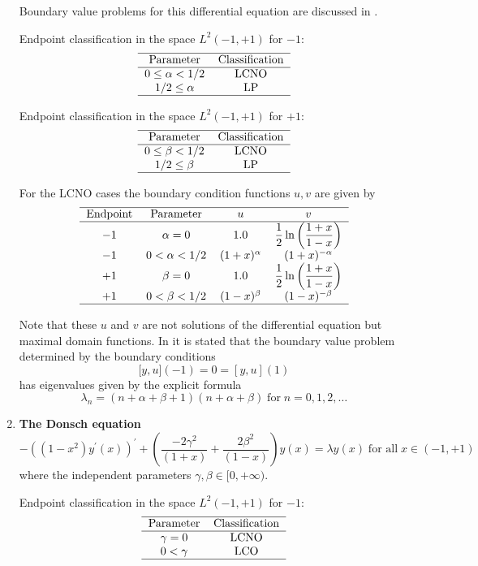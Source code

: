 \documentclass[12pt]{amsart}%
\theoremstyle{plain}
\numberwithin{equation}{section}
\begin{document}
\begin{enumerate}
Boundary value problems for this differential equation are discussed in
\cite[Chapter VIII, Pages 1515-20]{DS}.

Endpoint classification in the space $L^{2}(-1,+1)$ for $-1$:%
\[%
\begin{tabular}
[c]{cc}\hline
Parameter & Classification\\\hline
$0\leq\alpha<1/2$ & LCNO\\
$1/2\leq\alpha$ & LP\\\hline
\end{tabular}
\]

Endpoint classification in the space $L^{2}(-1,+1)$ for $+1$:%
\[%
\begin{tabular}
[c]{cc}\hline
Parameter & Classification\\\hline
$0\leq\beta<1/2$ & LCNO\\
$1/2\leq\beta$ & LP\\\hline
\end{tabular}
\]

For the LCNO cases the boundary condition functions $u,v$ are given by%
\[%
\begin{tabular}
[c]{cccc}\hline
Endpoint & Parameter & $u$ & $v$\\\hline
$-1$ & $\alpha=0$ & $1.0$ & $\dfrac{1}{2}\ln\left(  \dfrac{1+x}{1-x}\right)
$\\
$-1$ & $0<\alpha<1/2$ & $(1+x)^{\alpha}$ & $(1+x)^{-\alpha}$\\
$+1$ & $\beta=0$ & $1.0$ & $\dfrac{1}{2}\ln\left(  \dfrac{1+x}{1-x}\right)
$\\
$+1$ & $0<\beta<1/2$ & $(1-x)^{\beta}$ & $(1-x)^{-\beta}$\\\hline
\end{tabular}
\]

Note that these $u$ and $v$ are not solutions of the differential equation but
maximal domain functions. In \cite[Page 1519]{DS} it is stated that the
boundary value problem determined by the boundary conditions
\[
\lbrack y,u](-1)=0=[y,u](1)
\]
has eigenvalues given by the explicit formula
\[
\lambda_{n}=(n+\alpha+\beta+1)(n+\alpha+\beta)\;\text{for}\;n=0,1,2,\ldots
\]

\item \textbf{The Donsch equation}%
\[
-\left(  (1-x^{2})y^{\prime}(x)\right)  ^{\prime}+\left(  \frac{-2\gamma^{2}%
}{(1+x)}+\frac{2\beta^{2}}{(1-x)}\right)  y(x)=\lambda y(x)\;\text{for
all}\;x\in(-1,+1)
\]
where the independent parameters $\gamma,\beta\in\lbrack0,+\infty).$

Endpoint classification in the space $L^{2}(-1,+1)$ for $-1$:%
\[%
\begin{tabular}
[c]{cc}\hline
Parameter & Classification\\\hline
$\gamma=0$ & LCNO\\
$0<\gamma$ & LCO\\\hline
\end{tabular}
\]


\end{enumerate}
\end{document}
